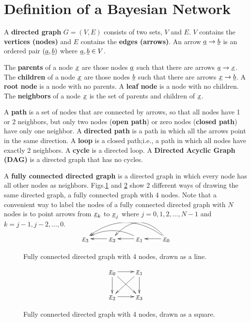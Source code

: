 \chapter*{Definition of a Bayesian Network}

\label{ch-bnet-def}

A {\bf directed graph} $G=(V,E)$
consists of two sets, $V$
and $E$. $V$ contains
the {\bf vertices (nodes)}
and $E$ contains the {\bf edges (arrows)}.
An arrow ${\underline{a}}\rightarrow {\underline{b}}$ is an
ordered pair
$({\underline{a}},{\underline{b}})$ where ${\underline{a}}, {\underline{b}}\in V$.

The {\bf parents}
of a node ${\underline{x}}$ are
those nodes ${\underline{a}}$
such that there are arrows
${\underline{a}}\rightarrow {\underline{x}}$.
The {\bf children} of a node
${\underline{x}}$
are those nodes ${\underline{b}}$
such that there are arrows ${\underline{x}}\rightarrow {\underline{b}}$.
A {\bf root node}
is a node with no parents.
A {\bf leaf node}
is a node with no children.
The {\bf neighbors}
of a node ${\underline{x}}$
is the set of parents and
children of ${\underline{x}}$.

A {\bf path} is a
set of nodes that
are connected
by arrows, so
that all nodes
have 1 or 2 neighbors,
but only two nodes ({\bf open path})
or zero nodes ({\bf closed path})
have only one neighbor.
A {\bf directed path}
is a path in
which all the arrows point
in the same direction.
A {\bf loop}
is a closed path;i.e.,
a path in which all
nodes have exactly 2 neighbors.
A {\bf cycle} is a directed loop.
A {\bf Directed Acyclic Graph (DAG)}
is a directed graph that has no
cycles.


A {\bf fully connected directed graph}
is
a directed graph
in which
every node has all other
nodes as neighbors.
Figs.\ref{fig-full-conn-4-line}
and
\ref{fig-full-conn-4-square}
show 2 different
ways of drawing
the same directed graph,
a fully connected graph with 4 nodes.
Note that a convenient
way
to label
the nodes of a fully
connected directed
graph
with $N$ nodes
is to point
arrows
from
${\underline{x}}_k$ to ${\underline{x}}_j$
where $j=0, 1, 2,\ldots, N-1$
and
$k=j-1, j-2, \ldots, 0$.


\begin{figure}[h!]
$$
\xymatrix{
\rvx_3
&\rvx_2\ar[l]
&\rvx_1\ar[l]\ar@/_1pc/[ll]
&\rvx_0\ar[l]\ar@/_2pc/[ll]\ar@/_2pc/[lll]
}
$$
\caption{Fully
connected directed  graph with 4 nodes,
drawn as a line.}
\label{fig-full-conn-4-line}
\end{figure}

\begin{figure}[h!]
$$
\xymatrix{
\rvx_0\ar[r]\ar[d]\ar[rd]&\rvx_1\ar[d]\ar[ld]
\\
\rvx_2\ar[r]&\rvx_3
}
$$
\caption{Fully
connected directed  graph with 4 nodes,
drawn as a square.}
\label{fig-full-conn-4-square}
\end{figure}

